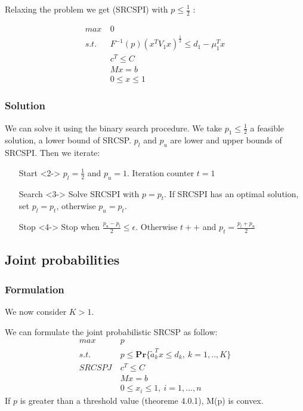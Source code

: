 \documentclass{beamer}
\begin{document}
\begin{frame}
Relaxing the problem we get (SRCSPI) with $p \leq \frac{1}{2}$ :

\begin{align*}
 max\ & 0\\
 s.t.\ & F^{-1}(p)(x^TV_1x)^{\frac{1}{2}} \leq d_1 - \mu_1^Tx \\
 & c^T \leq C \\
 & Mx = b \\
 & 0 \leq x \leq 1
\end{align*}
\end{frame}

\subsubsection{Solution}
\begin{frame}
We can solve it using the binary search procedure. We take $p_1 \leq \frac{1}{2}$ a feasible solution, a lower bound of SRCSP. $p_l$ and $p_u$ are lower and upper bounds of SRCSPI. Then we iterate:

\begin{itemize}
\item[Start]<2-> $p_l = \frac{1}{2}$ and $p_u = 1$. Iteration counter $t = 1$
\item[Search]<3-> Solve SRCSPI with $p = p_t$. If SRCSPI has an optimal solution, set $p_l = p_t$, otherwise $p_u = p_t$.
\item[Stop]<4-> Stop when $\frac{p_u - p_l}{2} \leq \epsilon$. Otherwise $t++$ and $p_t = \frac{p_l + p_u}{2} $
\end{itemize}

\end{frame}

\subsection{Joint probabilities}

\subsubsection{Formulation}
\begin{frame}
	We now consider $K > 1$.
	
	We can formulate the joint probabilistic SRCSP as follow:
\begin{align*}
 max\ & p\\
 s.t.\ & p \leq \mathbf{Pr} \{ \tilde{a}_k^Tx \leq d_k ,\ k=1,..,K \} \\
 SRCSPJ \ & c^T \leq C \\
 & Mx = b \\
 & 0 \leq x_i \leq 1, \ i = 1, ..., n
\end{align*}
\pause
If $p$ is greater than a threshold value (theoreme 4.0.1), M(p) is convex.
\end{frame}
\end{document}
